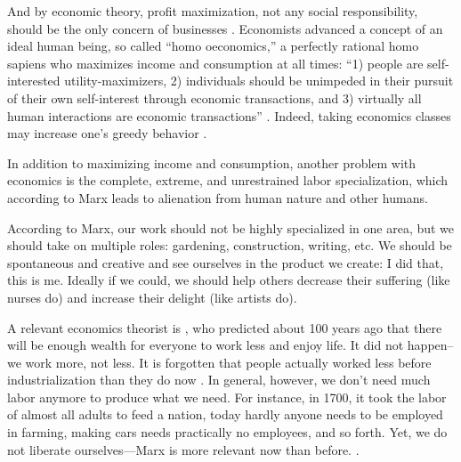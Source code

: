 \documentclass[10pt, letterpaper]{article}
\begin{document}
\begin{spacing}{1.8}
And by economic theory, profit maximization, not any social responsibility, should be the only concern of businesses \cite{friedman70}.
Economists advanced a concept of an ideal human being, so called ``homo oeconomics,'' a perfectly rational
homo sapiens who maximizes income and consumption at all times: %
``1) people are self-interested utility-maximizers, 2)
individuals should be unimpeded in their pursuit of their own self-interest
through economic transactions, and 3) virtually all human interactions are
economic transactions'' %
\citep[][p. 273]{walker1992greed}.
%
 Indeed, taking economics classes may increase one's greedy behavior \citep{wang11b}.

In addition to maximizing income and consumption, another problem with economics
is the complete, extreme, and unrestrained labor specialization, which according to Marx leads to alienation from human nature
and other humans.

According to Marx, our work should not be highly specialized in one area, but we should take on
multiple roles: gardening, construction, writing, etc. We should be spontaneous and creative and see ourselves in the product we create: I did that, this is
me. %
Ideally if we could, we should help others decrease their suffering (like nurses do) and increase their delight (like artists do). 

A relevant economics theorist is \citet{keynes30}, who predicted about 100 years
ago that there will be enough wealth for everyone to work less and enjoy
life. It did not happen--we work more, not less. It is forgotten that people
actually worked less before industrialization than they do now
\citep{schor08}. %
 In general, however, we don't need much labor anymore to produce what we need. For instance,
 in 1700, it took the labor of almost all adults to feed a nation, today hardly anyone needs to be employed in farming, making cars needs practically no employees, and so forth. Yet, we do not liberate ourselves---Marx is more relevant now than before.%
\citep{piketty14,peet15,menandMISC16oct3}. %


\end{spacing}
\end{document}
